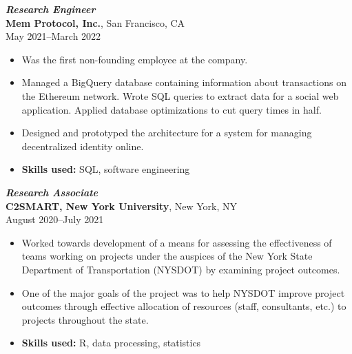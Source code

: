 \documentclass[letterpaper,12pt]{article}
\begin{document}
\textit{\textbf{Research Engineer}} \\
\textbf{Mem Protocol, Inc.}, San Francisco, CA \\
May 2021--March 2022
\begin{itemize}
  \item Was the first non-founding employee at the company.
  \item Managed a BigQuery database containing information about transactions on
        the Ethereum network. Wrote SQL queries to extract data for a social web
        application. Applied database optimizations to cut query times in half.
  \item Designed and prototyped the architecture for a system for managing
        decentralized identity online.
  \item \textbf{Skills used:} SQL, software engineering
\end{itemize}

\textit{\textbf{Research Associate}} \\
\textbf{C2SMART, New York University}, New York, NY \\
August 2020--July 2021
\begin{itemize}
  \item Worked towards development of a means for assessing the effectiveness of
        teams working on projects under the auspices of the New York State
        Department of Transportation (NYSDOT) by examining project outcomes.
  \item One of the major goals of the project was to help NYSDOT improve project
        outcomes through effective allocation of resources (staff, consultants,
        etc.) to projects throughout the state.
  \item \textbf{Skills used:} R, data processing, statistics
\end{itemize}

\iffalse
  \textit{\textbf{Freelance statistician}} \\
  Princeton, NJ \\
  June 2020--Present
  \begin{itemize}
    \item I currently offer data analysis and programming services through
          freelancer sites such as Guru and Upwork.
  \end{itemize}

  \textit{\textbf{Independent mathematics tutor}} \\
  Princeton, NJ \\
  February 2020--March 2020
  \begin{itemize}
    \item Tutored students from Princeton High School and Princeton University
          in mathematics.
  \end{itemize}
\fi
\end{document}
